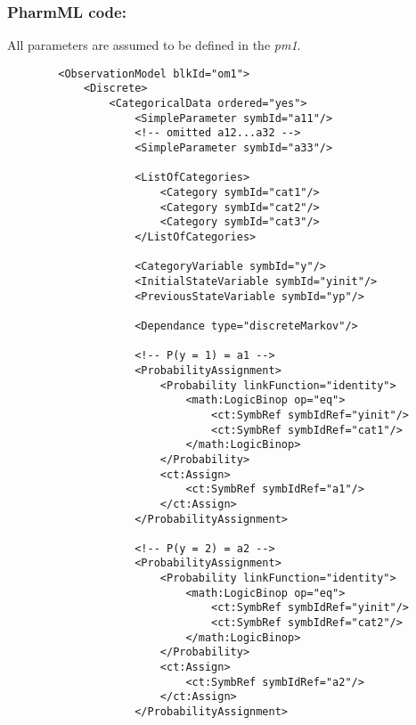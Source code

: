 \myEndLine

\subsubsection{PharmML code:}
All parameters are assumed to be defined in the  \emph{pm1}.

\lstset{language=XML}
\begin{lstlisting}
        <ObservationModel blkId="om1">
            <Discrete>
                <CategoricalData ordered="yes">
                    <SimpleParameter symbId="a11"/>
                    <!-- omitted a12...a32 -->
                    <SimpleParameter symbId="a33"/>
                    
                    <ListOfCategories> 
                        <Category symbId="cat1"/>
                        <Category symbId="cat2"/>
                        <Category symbId="cat3"/>
                    </ListOfCategories>
                    
                    <CategoryVariable symbId="y"/>
                    <InitialStateVariable symbId="yinit"/>
                    <PreviousStateVariable symbId="yp"/>
                    
                    <Dependance type="discreteMarkov"/>
                    
                    <!-- P(y = 1) = a1 -->
                    <ProbabilityAssignment>
                        <Probability linkFunction="identity">
                            <math:LogicBinop op="eq">
                                <ct:SymbRef symbIdRef="yinit"/>
                                <ct:SymbRef symbIdRef="cat1"/>
                            </math:LogicBinop>
                        </Probability>
                        <ct:Assign>
                            <ct:SymbRef symbIdRef="a1"/>
                        </ct:Assign>
                    </ProbabilityAssignment>
                    
                    <!-- P(y = 2) = a2 -->
                    <ProbabilityAssignment>
                        <Probability linkFunction="identity">
                            <math:LogicBinop op="eq">
                                <ct:SymbRef symbIdRef="yinit"/>
                                <ct:SymbRef symbIdRef="cat2"/>
                            </math:LogicBinop>
                        </Probability>
                        <ct:Assign>
                            <ct:SymbRef symbIdRef="a2"/>
                        </ct:Assign>
                    </ProbabilityAssignment>
                    

\end{lstlisting}
